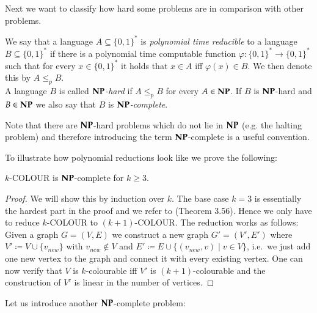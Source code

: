 Next we want to classify how hard some problems are in comparison with other problems.

\begin{Definition}
 We say that a language $A \subseteq {\lbrace 0,1 \rbrace}^*$ is \emph{polynomial time reducible} to a language 
 $B \subseteq {\lbrace 0,1 \rbrace}^*$ if there is a polynomial time computable function 
 ${\varphi \colon {\lbrace 0,1 \rbrace}^* \to {\lbrace 0,1 \rbrace}^*}$ such that for every $x \in {\lbrace 0,1 \rbrace}^*$ 
 it holds that $x \in A$ iff $\varphi (x) \in B$. We then denote this by $ A \leq_p B$. \\
 A language $B$ is called \emph{$\mathbf{NP}$-hard} if $A \leq_p B$ for every $A \in \mathbf{NP}$. If $B$ is $\mathbf{NP}$-hard
 and $B \in \mathbf{NP}$ we also say that $B$ is \emph{$\mathbf{NP}$-complete}.
\end{Definition}

\begin{Remark}
 Note that there are $\mathbf{NP}$-hard problems which do not lie in $\mathbf{NP}$ (e.g. the halting problem)
 and therefore introducing the term $\mathbf{NP}$-complete is a useful convention.
\end{Remark}


To illustrate how polynomial reductions look like we prove the following:

\begin{Theorem}
  $k$-COLOUR is $\mathbf{NP}$-complete for $k \geq 3$.
\end{Theorem}

\begin{proof}
 We will show this by induction over $k$.
 The base case $k = 3$ is essentially the hardest part in the proof and we refer to \cite{JorgRothe2008} (Theorem 3.56).
 Hence we only have to reduce $k$-COLOUR to $(k+1)$-COLOUR. The reduction works as follows: \newline
 Given a graph $G = (V,E)$ we construct a new graph $G' = (V', E')$ where $V' \coloneqq V \cup \lbrace v_{new} \rbrace$ with
 $v_{new} \notin V$ and $E' \coloneqq E \cup \lbrace (v_{new}, v) \; | \; v \in V \rbrace$, i.e.\ we just add one new vertex to the graph
 and connect it with every existing vertex. One can now verify that $V$ is $k$-colourable iff $V'$ is $(k+1)$-colourable and the
 construction of $V'$ is linear in the number of vertices.
 
\end{proof}

Let us introduce another $\mathbf{NP}$-complete problem:

